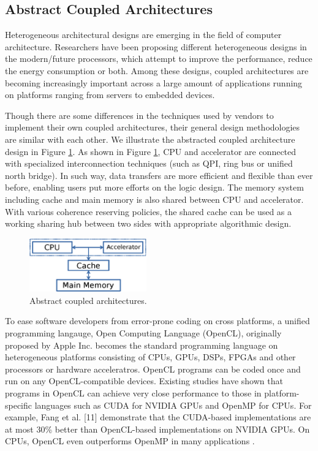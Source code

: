 
\subsection{Abstract Coupled Architectures}
Heterogeneous architectural designs are emerging in the field of computer architecture. Researchers have been proposing different heterogeneous designs in the modern/future processors, which attempt to improve the performance, reduce the energy consumption or both. Among these designs, coupled architectures are becoming increasingly important across a large amount of applications running on platforms ranging from servers to embedded devices.

Though there are some differences in the techniques used by vendors to implement their own coupled architectures, their general design methodologies are similar with each other. We illustrate the abstracted coupled architecture design in Figure \ref{fig:generalcoupledsystem}. As shown in Figure \ref{fig:generalcoupledsystem}, CPU and accelerator are connected with specialized interconnection techniques (such as QPI, ring bus or unified north bridge). In such way, data transfers are more efficient and flexible than ever before, enabling users put more efforts on the logic design. The memory system including cache and main memory is also shared between CPU and accelerator. With various coherence reserving policies, the shared cache can be used as a working sharing hub between two sides with appropriate algorithmic design.
\begin{figure}
	\centering
    \includegraphics[width=0.45\textwidth]{figures/generalCoupledSystem.eps}
    \caption{Abstract coupled architectures.} \label{fig:generalcoupledsystem}
\end{figure}

To ease software developers from error-prone coding on cross platforms, a unified programming langauge, Open Computing Language (OpenCL), originally proposed by Apple Inc. becomes the standard programming language on heterogeneous platforms consisting of CPUs, GPUs, DSPs, FPGAs and other processors or hardware acceleratros. OpenCL programs can be coded once and run on any OpenCL-compatible devices. Existing studies \cite{Fang2011, Thouti2012} have shown that programs in OpenCL can achieve very close performance to those in platform-specific languages such as CUDA for NVIDIA GPUs and OpenMP for CPUs. For example, Fang et al. [11] demonstrate that the CUDA-based implementations are at most 30\% better than OpenCL-based implementations on NVIDIA GPUs. On CPUs, OpenCL even outperforms OpenMP in many applications \cite{Thouti2012}.

